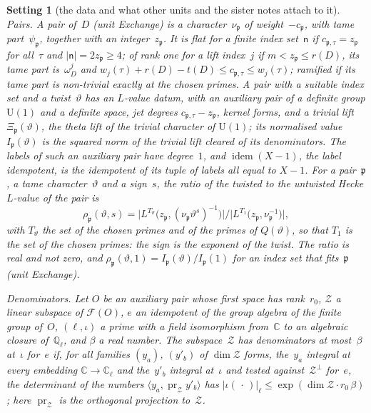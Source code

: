 \documentclass[11pt,a4paper]{article}
\newcommand{\kw}[1]{\emph{#1}}
\newcommand{\m}[1]{\mbox{$#1$}}        %
\theoremstyle{plainx}
\theoremstyle{uprightx}
\newtheorem{setting}[theorem]{Setting}          %
\newcommand{\CC}{\mathbb{C}}
\newcommand{\ix}[1]{\mathsf{#1}}
\newcommand{\UU}{\mathrm{U}}
\newcommand{\ip}[2]{\langle #1,#2\rangle}
\newcommand{\FormVx}[1]{\mathcal{F}(#1)}
\newcommand{\rat}[3]{\rho_{#1}(#2,#3)}      %
\newcommand{\idem}{\operatorname{idem}}
\newcommand{\triv}[2]{\Xi_{#1}(#2)}
\newcommand{\ialg}[2]{I_{#1}(#2)}
\begin{document}
\begin{setting}[the data and what other units and the sister notes attach to it]
\emph{Pairs.} A \kw{pair} of~$D$ (unit \emph{Exchange}) is a character~$\nu_{\mathfrak{p}}$ of weight~$-c_{\mathfrak{p}}$, with tame
part~$\psi_{\mathfrak{p}}$, together with an integer~$z_{\mathfrak{p}}$. It is \kw{flat} for a finite index set~$\ix n$ if \m{c_{\mathfrak{p},\tau}=z_{\mathfrak{p}}}
for all~$\tau$ and \m{|\ix n|=2z_{\mathfrak{p}}\ge4}; \kw{of rank one} for a lift index~$j$ if \m{m<z_{\mathfrak{p}}\le r(D)}, its tame part
is~$\omega_D^{j}$ and \m{w_j(\tau)+r(D)-t(D)\le c_{\mathfrak{p},\tau}\le w_j(\tau)}; \kw{ramified} if its tame part is non-trivial
exactly at the chosen primes. A pair with a suitable index set and a twist~$\vartheta$ has an \kw{$L$-value datum},
with an auxiliary pair of a definite group \m{\UU(1)} and a definite space, jet degrees \m{c_{\mathfrak{p},\tau}-z_{\mathfrak{p}}}, kernel
forms, and a \kw{trivial lift} \m{\triv{\mathfrak{p}}{\vartheta}}, the theta lift of the trivial character of \m{\UU(1)}; its
\kw{normalised value} \m{\ialg{\mathfrak{p}}{\vartheta}} is the squared norm of the trivial lift cleared of its denominators. The
labels of such an auxiliary pair have degree~$1$, and \m{\idem(X-1)}, the \kw{label idempotent}, is the idempotent of
its tuple of labels all equal to \m{X-1}. For a pair~$\mathfrak{p}$, a tame character~$\vartheta$ and a sign~$s$, the \kw{ratio}
of the twisted to the untwisted Hecke $L$-value of the pair is
\[\rat{\mathfrak{p}}{\vartheta}{s}=\bigl|L^{T_\vartheta}\bigl(z_{\mathfrak{p}},(\nu_{\mathfrak{p}}\vartheta^{s})^{-1}\bigr)\bigr|\Big/\bigl|L^{T_1}\bigl(z_{\mathfrak{p}},\nu_{\mathfrak{p}}^{-1}\bigr)\bigr|,\]
with \m{T_\vartheta} the set of the chosen primes and of the primes of \m{Q(\vartheta)}, so that $T_1$ is the set of the
chosen primes: the sign is the exponent of the twist. The ratio is real and not zero, and
\m{\rat{\mathfrak{p}}{\vartheta}{1}=\ialg{\mathfrak{p}}{\vartheta}/\ialg{\mathfrak{p}}{1}} for an index set that fits~$\mathfrak{p}$ (unit \emph{Exchange}).

\emph{Denominators.} Let $O$ be an auxiliary pair whose first space has rank~$r_0$, $\mathcal{Z}$ a linear subspace
of \m{\FormVx{O}}, $e$ an idempotent of the group algebra of the finite group of~$O$, \m{(\ell,\iota)} a prime with a
field isomorphism from~$\CC$ to an algebraic closure of~$\mathbb{Q}_\ell$, and $\beta$ a real number. The
subspace~$\mathcal{Z}$ has \kw{denominators at most~$\beta$ at~$\iota$ for~$e$} if, for all families \m{(y_a)},
\m{(y'_b)} of \m{\dim\mathcal{Z}} forms, the~$y_a$ integral at every embedding \m{\CC\to\CC_\ell} and the~$y'_b$
integral at~$\iota$ and tested against~\m{\mathcal{Z}^{\perp}} for~$e$, the determinant of the numbers
\m{\ip{y_a}{\operatorname{pr}_{\mathcal{Z}}y'_b}} has \m{|\iota(\,\cdot\,)|_\ell\le\exp(\dim\mathcal{Z}\cdot r_0\,\beta)}; here
\m{\operatorname{pr}_{\mathcal{Z}}} is the orthogonal projection to~$\mathcal{Z}$.


\end{setting}
\end{document}

